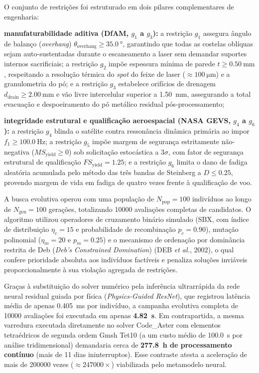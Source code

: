 O conjunto de restrições foi estruturado em dois pilares complementares de engenharia:
\begin{alineas}
  \item \textbf{manufaturabilidade aditiva (DfAM, $g_1$ a $g_3$):} a restrição $g_1$ assegura ângulo de balanço (\textit{overhang}) $\theta_{\text{overhang}} \ge \SI{35.0}{\degree}$, garantindo que todas as costelas oblíquas sejam auto-sustentadas durante o escaneamento a laser sem demandar suportes internos sacrificiais; a restrição $g_2$ impõe espessura mínima de parede $t \ge \SI{0.50}{\milli\metre}$, respeitando a resolução térmica do \textit{spot} do feixe de laser ($\approx \SI{100}{\micro\metre}$) e a granulometria do pó; e a restrição $g_3$ estabelece orifícios de drenagem $d_{\text{drain}} \ge \SI{2.00}{\milli\metre}$ e vão livre intercelular superior a \SI{1.50}{\milli\metre}, assegurando a total evacuação e despoeiramento do pó metálico residual pós-processamento;
  \item \textbf{integridade estrutural e qualificação aeroespacial (NASA GEVS, $g_4$ a $g_6$):} a restrição $g_4$ blinda o satélite contra ressonância dinâmica primária ao impor $f_1 \ge \SI{100.0}{\hertz}$; a restrição $g_5$ impõe margem de segurança estritamente não-negativa ($MS_{\text{yield}} \ge 0$) sob solicitação estocástica a $3\sigma$, com fator de segurança estrutural de qualificação $FS_{\text{yield}} = \num{1.25}$; e a restrição $g_6$ limita o dano de fadiga aleatória acumulada pelo método das três bandas de Steinberg a $D \le \num{0.25}$, provendo margem de vida em fadiga de quatro vezes frente à qualificação de voo.
\end{alineas}

A busca evolutiva operou com uma população de $N_{\text{pop}} = 100$ indivíduos ao longo de $N_{\text{gen}} = 100$ gerações, totalizando \num{10000} avaliações completas de candidatos. O algoritmo utilizou operadores de cruzamento binário simulado (SBX, com índice de distribuição $\eta_c = 15$ e probabilidade de recombinação $p_c = \num{0.90}$), mutação polinomial ($\eta_m = 20$ e $p_m = \num{0.25}$) e o mecanismo de ordenação por dominância restrita de Deb (\textit{Deb's Constrained Domination}) (DEB \textit{et al.}, 2002), o qual confere prioridade absoluta aos indivíduos factíveis e penaliza soluções inviáveis proporcionalmente à sua violação agregada de restrições.

Graças à substituição do solver numérico pela inferência ultrarrápida da rede neural residual guiada por física (\textit{Physics-Guided ResNet}), que registrou latência média de apenas \SI{0.405}{\milli\second} por indivíduo, a campanha evolutiva completa de \num{10000} avaliações foi executada em apenas \textbf{\SI{4.82}{\second}}. Em contrapartida, a mesma varredura executada diretamente no solver Code\_Aster com elementos tetraédricos de segunda ordem Gmsh Tet10 (a um custo médio de \SI{100.0}{\second} por análise tridimensional) demandaria cerca de \textbf{\SI{277.8}{\hour} de processamento contínuo} (mais de 11 dias ininterruptos). Esse contraste atesta a aceleração de mais de \num{200000} vezes ($\approx \num{247000}\times$) viabilizada pelo metamodelo neural.

